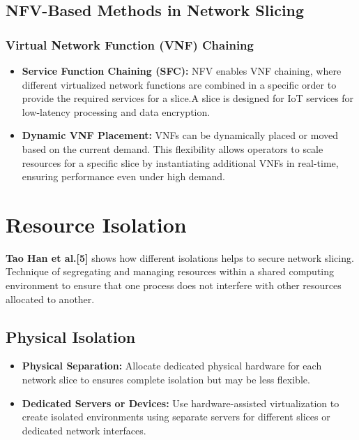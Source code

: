 \documentclass[oneside,a4paper,12pt]{report}
\begin{document}
\subsection{NFV-Based Methods in Network Slicing}
\subsubsection{Virtual Network Function (VNF) Chaining}
\begin{itemize}
\item \textbf{Service Function Chaining (SFC):} NFV enables VNF chaining, where different virtualized network functions are combined in a specific order to provide the required services for a slice.A slice is designed for IoT services for low-latency processing and data encryption.
\vspace*{0.3\baselineskip}
\newline \item \textbf{Dynamic VNF Placement:} VNFs can be dynamically placed or moved based on the current demand. This flexibility allows operators to scale resources for a specific slice by instantiating additional VNFs in real-time, ensuring performance even under high demand.
\end{itemize}

\vspace*{2\baselineskip}

\section{Resource Isolation }
\textbf{Tao Han et al.[5]} shows how different isolations helps to secure network slicing. 
\vspace*{1\baselineskip}
\newline Technique of segregating and managing resources within a shared computing environment to ensure that one process does not interfere with other resources allocated to another.



\subsection{Physical Isolation }
\begin{itemize}
\item \textbf{Physical Separation:} Allocate dedicated physical hardware for each network slice to ensures complete isolation but may be less flexible.
\item \textbf{Dedicated Servers or Devices:} Use hardware-assisted virtualization to create isolated environments using separate servers for different slices or dedicated network interfaces.
\end{itemize}
\end{document}
